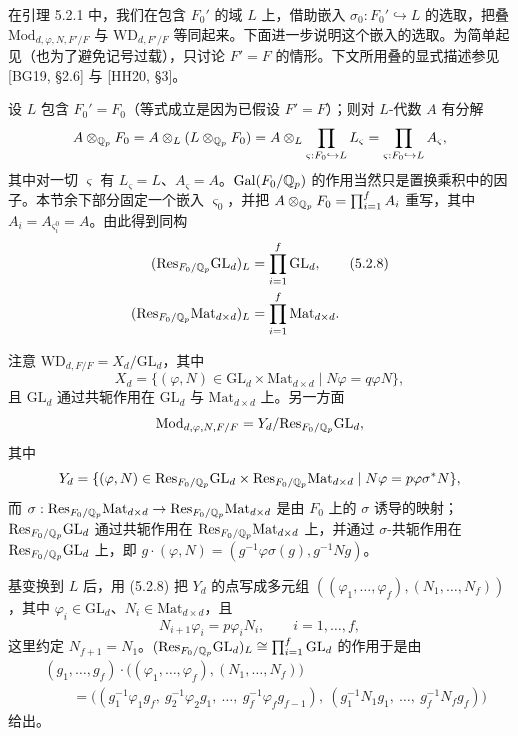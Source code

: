 在引理 5.2.1 中，我们在包含 $F_0'$ 的域 $L$ 上，借助嵌入 $\sigma_0: F_0'\hookrightarrow L$ 的选取，把叠 $\mathrm{Mod}_{d,\varphi,N,F'/F}$ 与 $\mathrm{WD}_{d,F'/F}$ 等同起来。下面进一步说明这个嵌入的选取。为简单起见（也为了避免记号过载），只讨论 $F'=F$ 的情形。下文所用叠的显式描述参见 [BG19, §2.6] 与 [HH20, §3]。

设 $L$ 包含 $F_0'=F_0$（等式成立是因为已假设 $F'=F$）；则对 $L$-代数 $A$ 有分解
\[
A\otimes_{\mathbb{Q}_p}F_0=A\otimes_L(L\otimes_{\mathbb{Q}_p}F_0)=A\otimes_L\prod_{\varsigma:F_0\hookrightarrow L}L_\varsigma=\prod_{\varsigma:F_0\hookrightarrow L}A_\varsigma,
\]
其中对一切 $\varsigma$ 有 $L_\varsigma=L$、$A_\varsigma=A$。$\operatorname{Gal}(F_0/\mathbb{Q}_p)$ 的作用当然只是置换乘积中的因子。本节余下部分固定一个嵌入 $\varsigma_0$，并把 $A\otimes_{\mathbb{Q}_p}F_0=\prod_{i=1}^fA_i$ 重写，其中 $A_i=A_{\varsigma_i^0}=A$。由此得到同构
\begin{align}
(\mathrm{Res}_{F_0/\mathbb{Q}_p}\mathrm{GL}_d)_L&=\prod_{i=1}^f\mathrm{GL}_d,\tag{5.2.8}\\
(\mathrm{Res}_{F_0/\mathbb{Q}_p}\mathrm{Mat}_{d\times d})_L&=\prod_{i=1}^f\mathrm{Mat}_{d\times d}.\notag
\end{align}

注意 $\mathrm{WD}_{d,F/F}=X_d/\mathrm{GL}_d$，其中
\[
X_d=\{(\varphi,N)\in\mathrm{GL}_d\times\mathrm{Mat}_{d\times d}\mid N\varphi=q\varphi N\},
\]
且 $\mathrm{GL}_d$ 通过共轭作用在 $\mathrm{GL}_d$ 与 $\mathrm{Mat}_{d\times d}$ 上。另一方面
\[
\mathrm{Mod}_{d,\varphi,N,F/F}=Y_d/\mathrm{Res}_{F_0/\mathbb{Q}_p}\mathrm{GL}_d,
\]
其中
\[
Y_d=\{(\varphi,N)\in\mathrm{Res}_{F_0/\mathbb{Q}_p}\mathrm{GL}_d\times\mathrm{Res}_{F_0/\mathbb{Q}_p}\mathrm{Mat}_{d\times d}\mid N\varphi=p\varphi\sigma^*N\},
\]
而 $\sigma:\mathrm{Res}_{F_0/\mathbb{Q}_p}\mathrm{Mat}_{d\times d}\to\mathrm{Res}_{F_0/\mathbb{Q}_p}\mathrm{Mat}_{d\times d}$ 是由 $F_0$ 上的 $\sigma$ 诱导的映射；$\mathrm{Res}_{F_0/\mathbb{Q}_p}\mathrm{GL}_d$ 通过共轭作用在 $\mathrm{Res}_{F_0/\mathbb{Q}_p}\mathrm{Mat}_{d\times d}$ 上，并通过 $\sigma$-共轭作用在 $\mathrm{Res}_{F_0/\mathbb{Q}_p}\mathrm{GL}_d$ 上，即 $g\cdot(\varphi,N)=(g^{-1}\varphi\sigma(g),g^{-1}Ng)$。

基变换到 $L$ 后，用 (5.2.8) 把 $Y_d$ 的点写成多元组 $((\varphi_1,\dots,\varphi_f),(N_1,\dots,N_f))$，其中 $\varphi_i\in\mathrm{GL}_d$、$N_i\in\mathrm{Mat}_{d\times d}$，且
\[
N_{i+1}\varphi_i=p\varphi_iN_i,\qquad i=1,\dots,f,
\]
这里约定 $N_{f+1}=N_1$。$(\mathrm{Res}_{F_0/\mathbb{Q}_p}\mathrm{GL}_d)_L\cong\prod_{i=1}^f\mathrm{GL}_d$ 的作用于是由
\[
\begin{aligned}
&(g_1,\dots,g_f)\cdot\bigl((\varphi_1,\dots,\varphi_f),(N_1,\dots,N_f)\bigr)\\
&\qquad=\bigl((g_1^{-1}\varphi_1g_f,\ g_2^{-1}\varphi_2g_1,\ \dots,\ g_f^{-1}\varphi_fg_{f-1}),\ (g_1^{-1}N_1g_1,\ \dots,\ g_f^{-1}N_fg_f)\bigr)
\end{aligned}
\]
给出。

